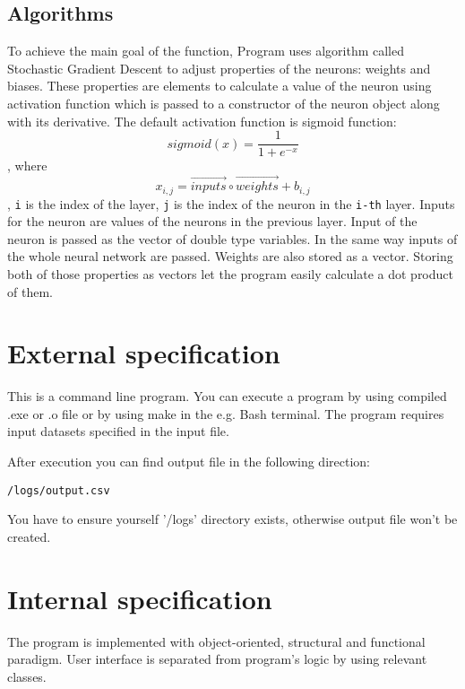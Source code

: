 \documentclass[12pt,a4paper,twoside]{article}
\begin{document}
\subsection{Algorithms}
To achieve the main goal of the function, Program uses algorithm called Stochastic Gradient Descent to adjust properties of the neurons: weights and biases. These properties are elements to calculate a value of the neuron using activation function which is passed to a constructor of the neuron object along with its derivative. The default activation function is sigmoid function: $$ sigmoid(x) = \frac{\mathrm{1} }{\mathrm{1} + e^{-x} }  $$, where $$ x_{i,j} =  \overrightarrow{inputs}  \circ  \overrightarrow{weights} +  b_{i,j} $$, \texttt{i} is the index of the layer, \texttt{j} is the index of the neuron in the \texttt{i-th} layer. Inputs for the neuron are values of the neurons in the previous layer. Input of the neuron is passed as the vector of double type variables. In the same way inputs of the whole neural network are passed. Weights are also stored as a vector. Storing both of those properties as vectors let the program easily calculate a dot product of them. 


\section{External specification}
\label{sec:external}
This is a command line program.%
You can execute a program by using compiled .exe or .o file or by using make in the e.g. Bash terminal.
The program requires input datasets specified in the input file.

After execution you can find output file in the following direction:
\begin{verbatim}
/logs/output.csv
\end{verbatim}

You have to ensure yourself '/logs' directory exists, otherwise output file won't be created.


\section{Internal specification}\label{sec:internal}
The program is implemented with object-oriented, structural and functional paradigm. User interface is separated from program's logic by using relevant classes.
\end{document}
